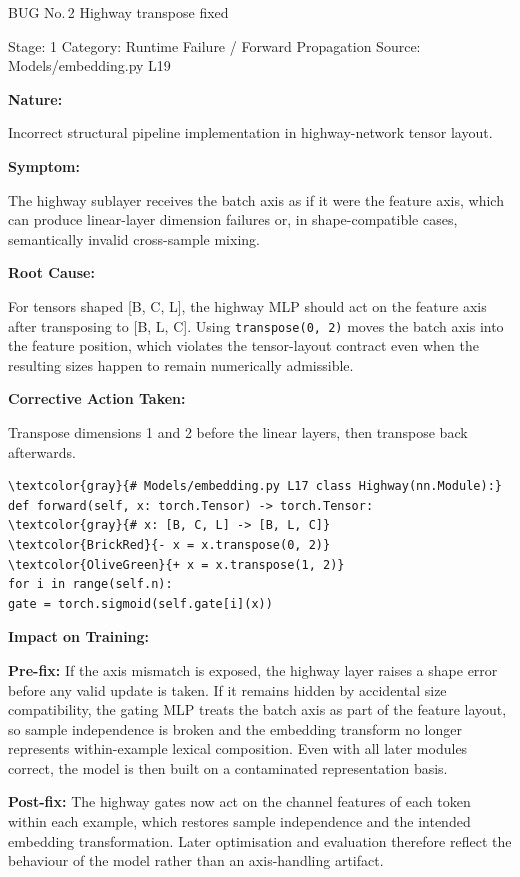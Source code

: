 \documentclass[10pt]{article}
\newcommand{\FieldLabel}[1]{%
 {\bfseries #1:}\par
}
\begin{document}
\begin{bugbox}{BUG No.\,2 \quad Highway transpose fixed}
{\color{MetaGray}\small Stage: 1 \;\textbar\; Category: Runtime Failure / Forward Propagation \;\textbar\; Source: Models/embedding.py L19\par}
\vspace{0.22em}
\FieldLabel{Nature}
Incorrect structural pipeline implementation in highway-network tensor layout.
\par
\vspace{0.35em}
\FieldLabel{Symptom}
The highway sublayer receives the batch axis as if it were the feature axis, which can produce linear-layer dimension failures or, in shape-compatible cases, semantically invalid cross-sample mixing.
\par
\vspace{0.35em}
\FieldLabel{Root Cause}
For tensors shaped {[}B, C, L{]}, the highway MLP should act on the feature axis after transposing to {[}B, L, C{]}. Using \texttt{transpose(0, 2)} moves the batch axis into the feature position, which violates the tensor-layout contract even when the resulting sizes happen to remain numerically admissible.
\par
\vspace{0.35em}
\FieldLabel{Corrective Action Taken}
Transpose dimensions 1 and 2 before the linear layers, then transpose back afterwards.
\par
\vspace{0.35em}
\begin{Verbatim}[commandchars=\\\{\},fontsize=\footnotesize,breaklines=true,breaksymbol={},frame=leftline,framerule=2pt,rulecolor=\color{gray!40},xleftmargin=6pt,formatcom=\singlespacing]
\textcolor{gray}{# Models/embedding.py L17 class Highway(nn.Module):}
def forward(self, x: torch.Tensor) -> torch.Tensor:
\textcolor{gray}{# x: [B, C, L] -> [B, L, C]}
\textcolor{BrickRed}{- x = x.transpose(0, 2)}
\textcolor{OliveGreen}{+ x = x.transpose(1, 2)}
for i in range(self.n):
gate = torch.sigmoid(self.gate[i](x))
\end{Verbatim}
\vspace{0.22em}
\FieldLabel{Impact on Training}
\textbf{Pre-fix:} If the axis mismatch is exposed, the highway layer raises a shape error before any valid update is taken. If it remains hidden by accidental size compatibility, the gating MLP treats the batch axis as part of the feature layout, so sample independence is broken and the embedding transform no longer represents within-example lexical composition. Even with all later modules correct, the model is then built on a contaminated representation basis.\par\smallskip
\textbf{Post-fix:} The highway gates now act on the channel features of each token within each example, which restores sample independence and the intended embedding transformation. Later optimisation and evaluation therefore reflect the behaviour of the model rather than an axis-handling artifact.
\par
\vspace{0.35em}
\end{bugbox}
\end{document}
